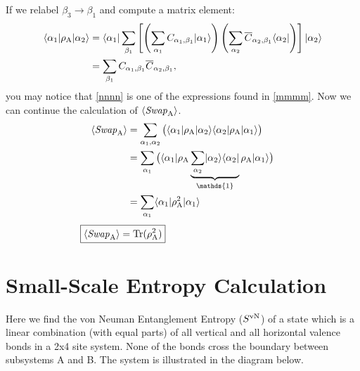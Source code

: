 If we relabel $\beta_3 \rightarrow \beta_1$ and compute a matrix element:
\begin{align}
	\langle {\alpha_1} \rvert\rho_{\rm A} \lvert {\alpha_2} \rangle
	&=   \langle {\alpha_1} \rvert\sum_{\beta_1}  \left[ \left(\sum_{\alpha_1} 
		C_{\alpha_1,\beta_1}\lvert {\alpha_1} \rangle\right)
		\left(\sum_{\alpha_2} 
		\overline{C}_{\alpha_2,\beta_1}\langle {\alpha_2} \rvert\right) \right] \lvert {\alpha_2} \rangle \\
	&= \sum_{\beta_1} C_{\alpha_1,\beta_1} \overline{C}_{\alpha_2,\beta_1} \label{nnnn},
\end{align}
you may notice that \eqref{nnnn} is one of the expressions found in \eqref{mmmm}.
Now we can continue the calculation of $\langle {\it Swap}_{\rm A} \rangle$.
\begin{align}
\langle \SWA \rangle &= \sum_{\alpha_1,\alpha_2} \big( \bra{\alpha_1}\rho_{\rm A} \ket{\alpha_2} 
					\bra{\alpha_2}\rho_{\rm A} \ket{\alpha_1}\big) \\
	&= \sum_{\alpha_1} \big( \bra{\alpha_1}\rho_{\rm A} 
				\underbrace{\sum_{\alpha_2} \ket{\alpha_2}\bra{\alpha_2}}_{\mathds{1}}
				\rho_{\rm A} \ket{\alpha_1}\big) \\
	&= \sum_{\alpha_1} \bra{\alpha_1}\rho_{\rm A}^2  \ket{\alpha_1}
\end{align}
\vspace{-5mm}
\begin{align}
	\hspace{-3.3cm}\boxed{\langle \SWA \rangle= {\rm Tr (\rho_A^2)}} \hspace{1cm}
\end{align}

\chapter{Small-Scale Entropy Calculation}
\label{small}
\newcommand{\ra}{\rangle}
\newcommand{\la}{\langle}
\newcommand{\ox}{\otimes}
\newcommand{\singlet}[2]{\left( \mid \up_#1 \dw_#2 \ra - \mid \dw_#1 \up_#2 \ra \right) }
\newcommand{\kb}[2]{\mid \! #1 \ra \la #2 \!\mid}

Here we find the von Neuman Entanglement Entropy ($S^{\rm vN}$) of a state which is a linear combination (with equal parts) of all vertical and all horizontal valence bonds in a 2x4 site system.
None of the bonds cross the boundary between subsystems A and B.  
The system is illustrated in the diagram below.\\ 


